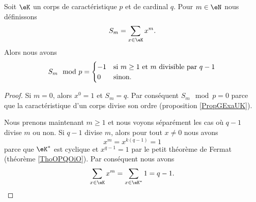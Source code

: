 \begin{lemma}
    Soit \( \eK\) un corps de caractéristique \( p\) et de cardinal \( q\). Pour \( m\in \eN\) nous définissons
    \begin{equation}
        S_m=\sum_{x\in \eK}x^m.
    \end{equation}
    Alors nous avons
    \begin{equation}
        S_m\mod p=\begin{cases}
            -1     &   \text{si \( m\geq 1\) et \( m\) divisible par \( q-1\)}\\
            0    &    \text{sinon}.
        \end{cases}
    \end{equation}
\end{lemma}

\begin{proof}
    Si \( m=0\), alors \( x^0=1\) et \( S_m=q\). Par conséquent \( S_m\mod p=0\) parce que la caractéristique d'un corps divise son ordre (proposition \ref{PropGExaUK}). 

    Nous prenons maintenant \( m\geq 1\) et nous voyons séparément les cas où \( q-1\) divise \( m\) ou non. Si \( q-1\) divise \( m\), alors pour tout \( x\neq 0\) nous avons
    \begin{equation}
        x^m=x^{k(q-1)}=1
    \end{equation}
    parce que \( \eK^*\) est cyclique et \( x^{q-1}=1\) par le petit théorème de Fermat (théorème \ref{ThoOPQOiO}). Par conséquent nous avons
    \begin{equation}
        \sum_{x\in \eK}x^m=\sum_{x\in \eK^*}1=q-1.
    \end{equation}
    

\end{proof}
